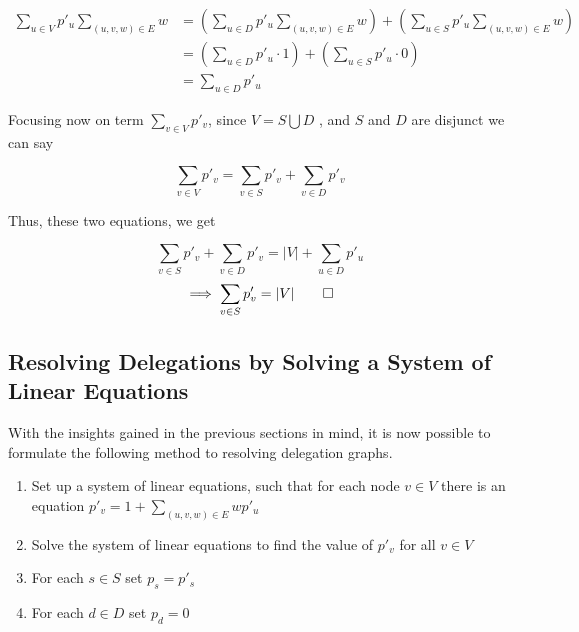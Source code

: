 \begin{align*}
\sum_{u \in V} p'_u  \sum_{(u, v, w) \in E} w &= \left(\sum_{u \in D} p'_u  \sum_{(u, v, w) \in E} w \right) + \left( \sum_{u \in S} p'_u  \sum_{(u, v, w) \in E} w \right) \\
&= \left( \sum_{u \in D} p'_u \cdot 1 \right) + \left(\sum_{u \in S} p'_u \cdot 0 \right) \\
&= \sum_{u \in D} p'_u
\end{align*}

Focusing now on term $\sum_{v \in V} p'_v$, since $V = S \bigcup D$ , and $S$ and $D$ are disjunct we can say

\[
\sum_{v \in V} p'_v = \sum_{v \in S} p'_v  + \sum_{v \in D} p'_v 
\]

Thus, these two equations, we get

\[
\sum_{v \in S} p'_v  + \sum_{v \in D} p'_v  = |V| + \sum_{u \in D} p'_u
\]
\[
\implies \sum_{v \in S} p'_v   = |V| \qed
\]


\subsection{Resolving Delegations by Solving a System of Linear Equations}

With the insights gained in the previous sections in mind, it is now possible to formulate the following method to resolving delegation graphs.

\begin{enumerate}
\item Set up a system of linear equations, such that for each node $v \in V$ there is an equation $p'_v = 1+\sum_{(u, v, w) \in E}wp'_u$
\item Solve the system of linear equations to find the value of $p'_v$ for all $v \in V$
\item For each $s \in S$ set $p_s = p'_s$
\item For each $d \in D$ set $p_d = 0$
\end{enumerate}

